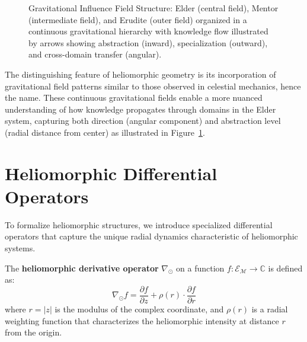\begin{definition}
\begin{enumerate}
\begin{definition}
\begin{enumerate}
\begin{figure}[h]
\caption{Gravitational Influence Field Structure: Elder (central field), Mentor (intermediate field), and Erudite (outer field) organized in a continuous gravitational hierarchy with knowledge flow illustrated by arrows showing abstraction (inward), specialization (outward), and cross-domain transfer (angular).}
\label{fig:gravitational_influence_fields}
\end{figure}

The distinguishing feature of heliomorphic geometry is its incorporation of gravitational field patterns similar to those observed in celestial mechanics, hence the name. These continuous gravitational fields enable a more nuanced understanding of how knowledge propagates through domains in the Elder system, capturing both direction (angular component) and abstraction level (radial distance from center) as illustrated in Figure~\ref{fig:gravitational_influence_fields}.

\section{Heliomorphic Differential Operators}

To formalize heliomorphic structures, we introduce specialized differential operators that capture the unique radial dynamics characteristic of heliomorphic systems.

\begin{definition}
The \textbf{heliomorphic derivative operator} $\nabla_{\odot}$ on a function $f: \mathcal{E}_{\mathcal{M}} \rightarrow \mathbb{C}$ is defined as:
\begin{equation}
\nabla_{\odot} f = \frac{\partial f}{\partial z} + \rho(r) \cdot \frac{\partial f}{\partial r}
\end{equation}
where $r = |z|$ is the modulus of the complex coordinate, and $\rho(r)$ is a radial weighting function that characterizes the heliomorphic intensity at distance $r$ from the origin.
\end{definition}


\end{enumerate}
\end{definition}
\end{enumerate}
\end{definition}
